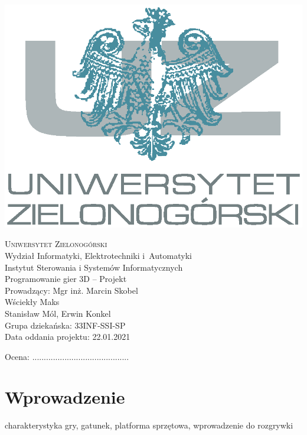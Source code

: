 \documentclass[10pt,a4paper]{article}
\begin{document}
\pagestyle{plain}
\begin{center}
\begin{center}
    \includegraphics[width=.55\textwidth]{logo}
\end{center}
\vspace{0.5cm}
\textsc{\Huge{Uniwersytet Zielonogórski}}\\
\LARGE{Wydział Informatyki, Elektrotechniki i~Automatyki}\\
\large{Instytut Sterowania i Systemów Informatycznych}\\
\vspace{0.5cm}
\Large{Programowanie gier 3D -- Projekt}\\
Prowadzący: Mgr inż. Marcin Skobel \\ 
\vspace{2cm}
\LARGE{Wściekły Maks}\\
\vspace{2cm} 
\Large{Stanisław Mól, Erwin Konkel} \\
\Large{Grupa dziekańska: 33INF-SSI-SP} \\
\vspace{0.5cm} 
\Large{Data oddania projektu: 22.01.2021}
\vspace{4cm}
\begin{flushleft}
	Ocena: ..........................................
\end{flushleft}
\vspace{1cm}
\end{center}

\footnotesize
\tableofcontents

\footnotesize
\lstlistoflistings

\noindent\makebox[\linewidth]{\rule{0.6\paperwidth}{0.4pt}}

\clearpage
\section{Wprowadzenie}
charakterystyka gry, gatunek, platforma sprzętowa, wprowadzenie do rozgrywki
\end{document}
